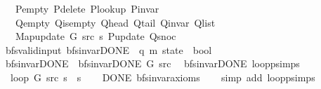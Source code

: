 \begin{isabellebody}
\ \ \ \ P{\isacharunderscore}{\kern0pt}empty\ P{\isacharunderscore}{\kern0pt}delete\ P{\isacharunderscore}{\kern0pt}lookup\ P{\isacharunderscore}{\kern0pt}invar\isanewline
\ \ \ \ Q{\isacharunderscore}{\kern0pt}empty\ Q{\isacharunderscore}{\kern0pt}is{\isacharunderscore}{\kern0pt}empty\ Q{\isacharunderscore}{\kern0pt}head\ Q{\isacharunderscore}{\kern0pt}tail\ Q{\isacharunderscore}{\kern0pt}invar\ Q{\isacharunderscore}{\kern0pt}list\isanewline
\ \ \ \ Map{\isacharunderscore}{\kern0pt}update\ G\ src\ s\ P{\isacharunderscore}{\kern0pt}update\ Q{\isacharunderscore}{\kern0pt}snoc{\isachardoublequoteclose}\isanewline
\isanewline
{}\isamarkupfalse%
\ {\isacharparenleft}{\kern0pt}\ bfs{\isacharunderscore}{\kern0pt}valid{\isacharunderscore}{\kern0pt}input{\isacharparenright}{\kern0pt}\ bfs{\isacharunderscore}{\kern0pt}invar{\isacharunderscore}{\kern0pt}DONE{\isacharprime}{\kern0pt}{\isacharprime}{\kern0pt}\ {\isacharcolon}{\kern0pt}{\isacharcolon}{\kern0pt}\ {\isachardoublequoteopen}{\isacharparenleft}{\kern0pt}{\isacharprime}{\kern0pt}q{\isacharcomma}{\kern0pt}\ {\isacharprime}{\kern0pt}m{\isacharparenright}{\kern0pt}\ state\ {\isasymRightarrow}\ bool{\isachardoublequoteclose}\ \isanewline
\ \ {\isachardoublequoteopen}bfs{\isacharunderscore}{\kern0pt}invar{\isacharunderscore}{\kern0pt}DONE{\isacharprime}{\kern0pt}{\isacharprime}{\kern0pt}\ {\isasymequiv}\ bfs{\isacharunderscore}{\kern0pt}invar{\isacharunderscore}{\kern0pt}DONE{\isacharprime}{\kern0pt}\ G\ src{\isachardoublequoteclose}\isanewline
\isanewline
{}\isamarkupfalse%
\ {\isacharparenleft}{\kern0pt}\ bfs{\isacharunderscore}{\kern0pt}invar{\isacharunderscore}{\kern0pt}DONE{\isacharparenright}{\kern0pt}\ loop{\isacharunderscore}{\kern0pt}psimps{\isacharcolon}{\kern0pt}\isanewline
\ \ \ {\isachardoublequoteopen}loop\ G\ src\ s\ {\isacharequal}{\kern0pt}\ s{\isachardoublequoteclose}%
\endisataginvisible
{\isafoldinvisible}%
%
\isadeliminvisible
\isanewline
%
\endisadeliminvisible
%
\isadelimproof
\ \ %
\endisadelimproof
%
\isatagproof
{}\isamarkupfalse%
\ DONE\ bfs{\isacharunderscore}{\kern0pt}invar{\isacharunderscore}{\kern0pt}axioms\isanewline
\ \ \isamarkupfalse%
\ {\isacharparenleft}{\kern0pt}simp\ add{\isacharcolon}{\kern0pt}\ loop{\isacharunderscore}{\kern0pt}psimps{\isacharparenright}{\kern0pt}%
\endisatagproof
{\isafoldproof}%
%
\isadelimproof
\isanewline
%
\endisadelimproof
%
\isadeliminvisible
\isanewline
%
\endisadeliminvisible
%
\isataginvisible
{}\isamarkupfalse%

\end{isabellebody}

